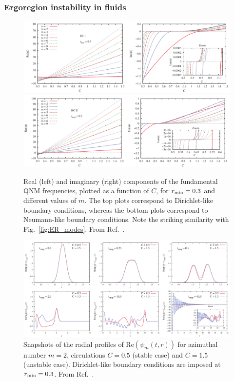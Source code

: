 \documentclass[11pt]{article}
\numberwithin{equation}{section} %
\begin{document}
\subsubsection{Ergoregion instability in fluids}
%  
\begin{figure}
\includegraphics[width=14cm]{Freq_C_BCI.pdf}\\
\includegraphics[width=14cm]{Freq_C_BCII.pdf}
\caption{Real (left) and imaginary (right) components of the fundamental QNM frequencies, plotted as a function of $C$, for $r_{\rm min}=0.3$ and different values of  $m$.
The top plots correspond to Dirichlet-like boundary conditions, whereas the bottom plots correspond to Neumann-like boundary conditions. Note the striking similarity with Fig.~\ref{fig:ER_modes}. From Ref.~\cite{Oliveira:2014oja}.
}
\label{fig-stable1}
\end{figure}
%
%
\begin{figure}
\includegraphics[width=14.8cm]{snapshot_m2.pdf}
\caption{Snapshots of the radial profiles of $\text{Re}(\psi_{m}(t, r))$ for azimuthal number $m = 2$, circulations $C=0.5$ (stable case) and $C=1.5$ (unstable case). Dirichlet-like boundary conditions are imposed at $r_{\rm min}=0.3$. From Ref.~\cite{Oliveira:2014oja}.}
\label{fig_snapshots}
\end{figure} 
\end{document}

